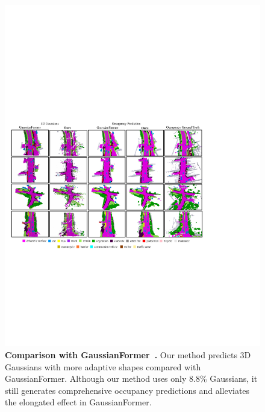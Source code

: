 \begin{figure}[t]
\centering
\includegraphics[width=0.95\linewidth]{figures/vis_comparison_1.pdf}
\vspace{-2mm}
\caption{\textbf{Comparison with GaussianFormer~\cite{huang2024gaussian}.}
Our method predicts 3D Gaussians with more adaptive shapes compared with GaussianFormer.
Although our method uses only 8.8\% Gaussians, it still generates comprehensive occupancy predictions and alleviates the elongated effect in GaussianFormer.
}
\label{fig:comparison}
\vspace{-3mm}
\end{figure}


